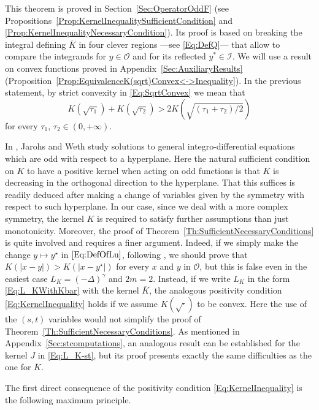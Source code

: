 \documentclass[12pt,reqno]{amsart}
\theoremstyle{definition}
\theoremstyle{remark}
\newcommand{\ical}{\mathcal{I}}
\newcommand{\ocal}{\mathcal{O}}
\newcommand{\s}{\gamma}
\newcommand{\fraclaplacian}{(-\Delta)^\s}
\numberwithin{equation}{section}
\begin{document}
	This theorem is proved in Section~\ref{Sec:OperatorOddF} (see Propositions~\ref{Prop:KernelInequalitySufficientCondition} and \ref{Prop:KernelInequalityNecessaryCondition}). Its proof is based on breaking the integral defining $\overline{K}$ in four clever regions ---see \eqref{Eq:DefQ}--- that allow to compare the integrands for $y\in \ocal$ and for its reflected $y^*\in \ical$. We will use a result on convex functions proved in Appendix~\ref{Sec:AuxiliaryResults} (Proposition~\ref{Prop:EquivalenceK(sqrt)Convex<->Inequality}). In the previous statement, by strict convexity in \eqref{Eq:SqrtConvex} we mean that
	$$
	K(\sqrt{\tau_1}) + K(\sqrt{\tau_2}) > 2 K(\sqrt{(\tau_1 + \tau_2)/2})
	$$
	for every $\tau_1$, $\tau_2 \in (0,+\infty)$.
	
	In \cite{JarohsWeth}, Jarohs and Weth study solutions to general integro-differential equations which are odd with respect to a hyperplane. Here the natural sufficient condition on $K$ to have a positive kernel when acting on odd functions is that $K$ is decreasing in the orthogonal direction to the hyperplane. That this suffices is readily deduced after making a change of variables given by the symmetry with respect to such hyperplane. In our case, since we deal with a more complex symmetry, the kernel $K$ is required to satisfy further assumptions than just monotonicity. Moreover, the proof of Theorem~\ref{Th:SufficientNecessaryConditions} is quite involved and requires a finer argument. Indeed, if we simply make the change $y \mapsto y^\star$ in $\eqref{Eq:DefOfLu}$, following \cite{JarohsWeth}, we should prove that $K(|x-y|) > K(|x-y^\star|)$ for every $x$ and $y$ in $\ocal$, but this is false even in the easiest case $L_K = \fraclaplacian$ and $2m=2$. Instead, if we write $L_K$ in the form \eqref{Eq:L_KWithKbar} with the kernel $\overline{K}$, the analogous positivity condition \eqref{Eq:KernelInequality} holds if we assume $K(\sqrt{\cdot})$ to be convex. Here the use of the $(s,t)$ variables would not simplify the proof of Theorem~\ref{Th:SufficientNecessaryConditions}. As mentioned in Appendix~\ref{Sec:stcomputations}, an analogous result can be established for the kernel $J$ in \eqref{Eq:L_K-st}, but its proof presents exactly the same difficulties as the one for $\overline{K}$.
	
	
	The first direct consequence of the positivity condition \eqref{Eq:KernelInequality} is the following maximum principle.
	
\end{document}
